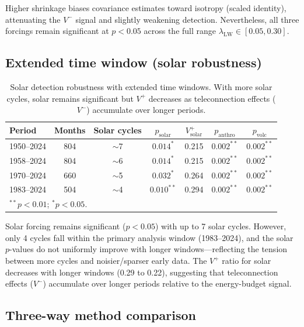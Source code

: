 \documentclass[preprint,12pt]{elsarticle}
\newcommand{\pval}{p}
\begin{document}
Higher shrinkage biases covariance estimates toward isotropy (scaled identity), attenuating the $V^-$ signal and slightly weakening detection.
Nevertheless, all three forcings remain significant at $\pval < 0.05$ across the full range $\lambda_\mathrm{LW} \in [0.05, 0.30]$.

\subsection{Extended time window (solar robustness)}\label{app:extended}

\begin{table}[h]
\centering
\caption{Solar detection robustness with extended time windows. With more solar cycles, solar remains significant but $V^+$ decreases as teleconnection effects ($V^-$) accumulate over longer periods.}
\label{tab:B3}
\begin{tabular}{lcccccc}
\toprule
Period & Months & Solar cycles & $\pval_\mathrm{solar}$ & $V^+_\mathrm{solar}$ & $\pval_\mathrm{anthro}$ & $\pval_\mathrm{volc}$ \\
\midrule
1950--2024 & 804 & $\sim$7 & $0.014^{*}$ & 0.215 & $0.002^{**}$ & $0.002^{**}$ \\
1958--2024 & 804 & $\sim$6 & $0.014^{*}$ & 0.215 & $0.002^{**}$ & $0.002^{**}$ \\
1970--2024 & 660 & $\sim$5 & $0.032^{*}$ & 0.264 & $0.002^{**}$ & $0.002^{**}$ \\
1983--2024 & 504 & $\sim$4 & $0.010^{**}$ & 0.294 & $0.002^{**}$ & $0.002^{**}$ \\
\bottomrule
\multicolumn{7}{l}{\footnotesize $^{**}\pval < 0.01$;\; $^{*}\pval < 0.05$.}
\end{tabular}
\end{table}

Solar forcing remains significant ($\pval < 0.05$) with up to 7 solar cycles.
However, only 4 cycles fall within the primary analysis window (1983--2024), and the solar $p$-values do not uniformly improve with longer windows---reflecting the tension between more cycles and noisier/sparser early data.
The $V^+$ ratio for solar decreases with longer windows (0.29 to 0.22), suggesting that teleconnection effects ($V^-$) accumulate over longer periods relative to the energy-budget signal.

\subsection{Three-way method comparison}\label{app:threeway}
\end{document}
